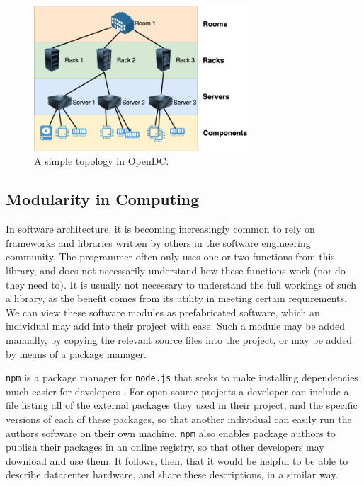 \documentclass[11pt]{article}
\begin{document}
		\begin{figure}[]
			\centering
			\includegraphics[width=8cm]{opendc-topology.png}
			\caption[A simple topology in OpenDC]{A simple topology in OpenDC.}
			\label{fig:example-opendc-topology}
		\end{figure}
	
	\subsection{Modularity in Computing}
		In software architecture, it is becoming increasingly common to rely on frameworks and libraries written by others in the software engineering community. 
		The programmer often only uses one or two functions from this library, and does not necessarily understand how these functions work (nor do they need to).
		It is usually not necessary to understand the full workings of such a library, as the benefit comes from its utility in meeting certain requirements. 
		We can view these software modules as prefabricated software, which an individual may add into their project with ease. 
		Such a module may be added manually, by copying the relevant source files into the project, or may be added by means of a package manager.
		
		\verb|npm| is a package manager for \verb|node.js| that seeks to make installing dependencies much easier for developers \cite{Wittern2016}.
		For open-source projects a developer can include a file listing all of the external packages they used in their project, and the specific versions of each of these packages, so that another individual can easily run the authors software on their own machine.
		\verb|npm| also enables package authors to publish their packages in an online registry, so that other developers may download and use them.
		It follows, then, that it would be helpful to be able to describe datacenter hardware, and share these descriptions, in a similar way. 
\end{document}
